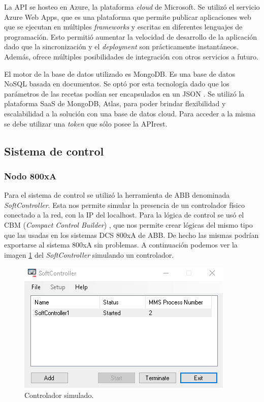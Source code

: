La API se hosteo en Azure, la plataforma \textit{cloud} de Microsoft. Se utilizó el servicio Azure Web Apps, que es una plataforma que permite publicar aplicaciones web que se ejecutan en múltiples \textit{frameworks} y escritas en diferentes lenguajes de programación. Esto permitió aumentar la velocidad de desarrollo de la aplicación dado que la sincronización y el \textit{deployment} son prácticamente instantáneos. Además, ofrece múltiples posibilidades de integración con otros servicios a futuro.

El motor de la base de datos utilizado es MongoDB. Es una base de datos NoSQL basada en documentos. Se optó por esta tecnología dado que los parámetros de las recetas podían ser encapsulados en un JSON . Se utilizó la plataforma SaaS de MongoDB, Atlas, para poder brindar flexibilidad y escalabilidad a la solución con una base de datos cloud. Para acceder a la misma se debe utilizar una \textit{token} que sólo posee la APIrest. 

\subsection{Sistema de control}
\subsubsection{Nodo 800xA}
Para el sistema de control se utilizó la herramienta de ABB denominada \textit{SoftController}. Esta nos permite simular la presencia de un controlador físico conectado a la red, con la IP del localhost. Para la lógica de control se usó el CBM (\textit{Compact Control Builder}) , que nos permite crear lógicas del mismo tipo que las usadas en los sistemas DCS 800xA de ABB. De hecho las mismas podrían exportarse al sistema 800xA sin problemas. A continuación podemos ver la imagen \ref{fig:c1} del \textit{SoftController} simulando un controlador.

\begin{figure}[htpb]
	\centering
	\includegraphics[scale=.6]{./Figures/c1.png}
	\caption{Controlador simulado\protect\footnotemark.}
	\label{fig:c1}
\end{figure}

